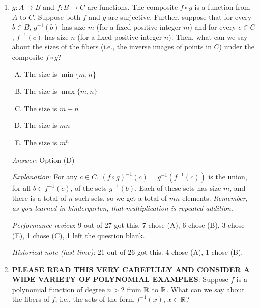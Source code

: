 \documentclass[10pt]{amsart}
\begin{document}
\begin{enumerate}
  {\em Answer}: Option (E)

  {\em Explanation}: The composite $f \circ g$ is bijective, so it is
  both injective and surjective. The results of the previous two
  questions now take care of things.

  {\em Performance review}: 18 out of 27 got this. 4 chose (A), 2 each
  chose (C) and (D), 1 left the question blank.

  {\em Historical note (last time)}: $23$ out of $26$ got this. $2$ chose (D),
  $1$ chose (A).

\item $g:A \to B$ and $f:B \to C$ are functions. The composite $f
  \circ g$ is a function from $A$ to $C$. Suppose both $f$ and $g$ are
  surjective. Further, suppose that for every $b \in B$, $g^{-1}(b)$
  has size $m$ (for a fixed positive integer $m$) and for every $c \in
  C$, $f^{-1}(c)$ has size $n$ (for a fixed positive integer
  $n$). Then, what can we say about the sizes of the fibers (i.e., the
  inverse images of points in $C$) under the composite $f \circ g$?

  \begin{enumerate}[(A)]
  \item The size is $\min \{ m,n \}$
  \item The size is $\max \{ m,n \}$
  \item The size is $m + n$
  \item The size is $mn$
  \item The size is $m^n$
  \end{enumerate}

  {\em Answer}: Option (D)

  {\em Explanation}: For any $c \in C$, $(f \circ g)^{-1}(c) =
  g^{-1}(f^{-1}(c))$ is the union, for all $b \in f^{-1}(c)$, of the
  sets $g^{-1}(b)$. Each of these sets has size $m$, and there is a
  total of $n$ such sets, so we get a total of $mn$ elements. {\em
    Remember, as you learned in kindergarten, that multiplication is
    repeated addition}.

  {\em Performance review}: 9 out of 27 got this. 7 chose (A), 6 chose
  (B), 3 chose (E), 1 chose (C), 1 left the question blank.

  {\em Historical note (last time)}: $21$ out of $26$ got this. $4$ chose (A),
  $1$ chose (B).

\item {\bf PLEASE READ THIS VERY CAREFULLY AND CONSIDER A WIDE VARIETY
  OF POLYNOMIAL EXAMPLES}: Suppose $f$ is a polynomial function of
  degree $n > 2$ from $\mathbb{R}$ to $\mathbb{R}$. What can we say about the fibers
  of $f$, i.e., the sets of the form $f^{-1}(x)$, $x \in \mathbb{R}$?


\end{enumerate}
\end{document}
